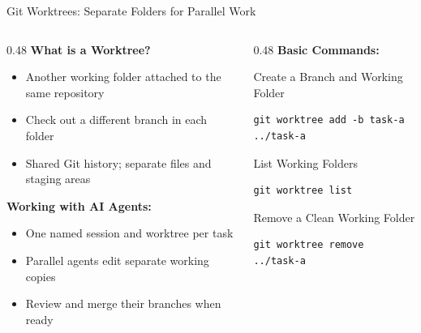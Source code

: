 \documentclass[11pt,aspectratio=169]{beamer}
\begin{document}
\begin{frame}[fragile]{Git Worktrees: Separate Folders for Parallel Work}
\begin{columns}[t]
\begin{column}{0.48\textwidth}
\textbf{What is a Worktree?}
\begin{itemize}\setlength{\itemsep}{0pt}
    \item Another working folder attached to the same repository
    \item Check out a different branch in each folder
    \item Shared Git history; separate files and staging areas
\end{itemize}
\vspace{0.2cm}
\textbf{Working with AI Agents:}
\begin{itemize}\setlength{\itemsep}{0pt}
    \item One named session and worktree per task
    \item Parallel agents edit separate working copies
    \item Review and merge their branches when ready
\end{itemize}
\end{column}
\begin{column}{0.48\textwidth}
\textbf{Basic Commands:}
\begin{block}{Create a Branch and Working Folder}
\small
\begin{verbatim}
git worktree add -b task-a ../task-a
\end{verbatim}
\end{block}
\begin{block}{List Working Folders}
\small
\begin{verbatim}
git worktree list
\end{verbatim}
\end{block}
\begin{block}{Remove a Clean Working Folder}
\small
\begin{verbatim}
git worktree remove ../task-a
\end{verbatim}
\end{block}
\end{column}
\end{columns}
\end{frame}
\end{document}
